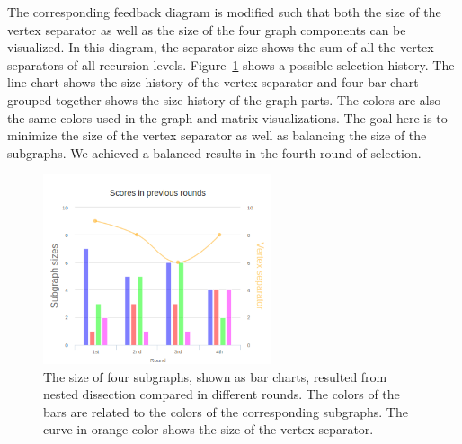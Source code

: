 \documentclass[12pt, twoside,a4paper,toc=bibliography]{scrbook}
\begin{document}
The corresponding feedback diagram is modified such that
both the size of the vertex separator as well as the size of the four graph components
can be visualized. In this diagram, the separator size shows the sum of all
the vertex separators of all recursion levels.
Figure~\ref{barchart} shows a possible selection history.
The line chart shows the size history of the vertex separator
and four-bar chart grouped together shows the size history of the graph parts.
The colors are also the same colors used in the graph and matrix visualizations.
The goal here is to minimize the size of the vertex separator as well as balancing the
size of the subgraphs. We achieved a balanced results in the fourth round of selection.
\begin{figure}
\centering
\includegraphics[width=0.6\textwidth]{chart2}
\caption{The size of four subgraphs, shown as bar charts,
resulted from nested dissection compared in different rounds.
The colors of the bars are related to the colors of the corresponding subgraphs.
The curve in orange color shows the size of the vertex separator.}
\label{barchart}
\end{figure}

\clearpage
\end{document}
